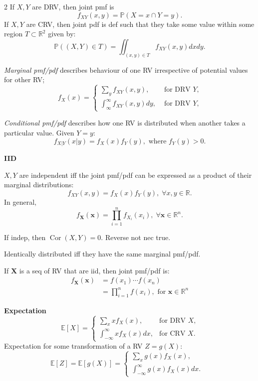 \documentclass[10pt]{extarticle}
\theoremstyle{definition}
\theoremstyle{remark}
\newcommand{\R}{\mathbb{R}}
\newcommand{\pf}{\mathbb{P}}
\newcommand{\E}{\mathbb{E}}
\DeclareMathOperator{\Cor}{Cor}
\begin{document}
\begin{multicols}{2}
    If $X, Y$ are DRV, then joint pmf is \[ 
        f_{XY}(x,y) = \pf(X = x \cap Y = y).
    \]
    If $X,Y$ are CRV, then joint pdf is def such that they take some value
    within some region $T \subset \R^2$ given by: \[
        \pf((X,Y) \in T) = \iint_{(x,y) \in T} f_{XY}(x,y)dxdy.
    \]

    \textit{Marginal pmf/pdf} describes behaviour of one RV irrespective of 
    potential values for other RV; \[
        f_X(x) = 
        \begin{cases}
            \sum_y f_{XY}(x, y), & \text{ for DRV $Y$,} \\
            \int_{\infty}^{\infty} f_{XY}(x, y)dy, & \text{ for DRV $Y$,}
        \end{cases}
    \]

    \textit{Conditional pmf/pdf} describes how one RV is distributed when
    another takes a particular value. Given $Y = y$: \[
        f_{X | Y} (x | y) = f_X(x) f_Y(y), \text{ where $f_Y(y) > 0$.}
    \]

    \noindent
    \textbf{IID}

    $X,Y$ are independent iff the joint pmf/pdf can be expressed as a product
    of their marginal distributions: \[
        f_{XY}(x,y) = f_X(x)f_Y(y), \; \forall x,y \in \R.
    \]
    In general, \[
        f_\mathbf{X}(\mathbf{x}) = \prod_{i = 1}^{n} f_{X_i}(x_i), \; \forall
        \mathbf{x} \in \R^n.
    \]

    If indep, then $\Cor(X, Y) = 0$. Reverse not nec true. 

    Identically distributed iff they have the same marginal pmf/pdf. 

    If $\mathbf{X}$ is a seq of RV that are iid, then joint pmf/pdf is: 
    \begin{align*}
        f_{\mathbf{X}}(\mathbf{x}) &= f(x_1) \cdots f(x_n) \\
        &=\prod_{i = 1}^{n} f(x_i), \text{ for $\mathbf{x} \in \R^n$}
    \end{align*}

    \noindent
    \textbf{Expectation}
    \[
        \E[X] = \begin{cases}
            \sum_x xf_X(x), & \text{for DRV $X$,} \\
            \int_{-\infty}^{\infty} xf_X(x)dx, & \text{for CRV $X$.}
        \end{cases}
    \]
    Expectation for some transformation of a RV $Z = g(X)$: 
    \[ 
        \E[Z] = \E[g(X)] = \begin{cases}
            \sum_x g(x)f_X(x), & \\
            \int_{-\infty}^{\infty} g(x)f_X(x)dx. & 
        \end{cases}
    \]


\end{multicols}
\end{document}
